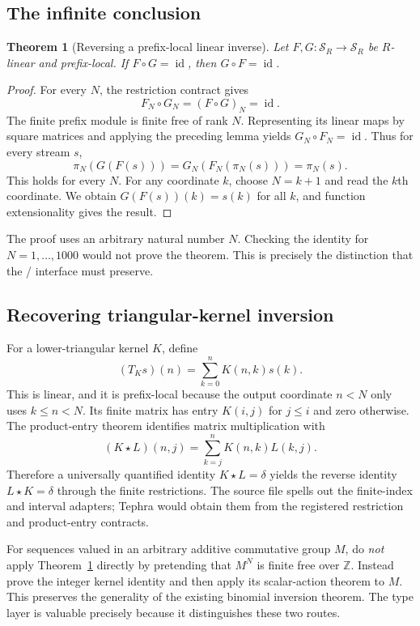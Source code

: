 \documentclass[11pt,a4paper]{article}
\newcommand{\code}[1]{\texttt{\detokenize{#1}}}
\newcommand{\Z}{\mathbb Z}
\newcommand{\id}{\operatorname{id}}
\theoremstyle{plain}
\newtheorem{theorem}{Theorem}[section]
\theoremstyle{definition}
\begin{document}
\subsection{The infinite conclusion}
\begin{theorem}[Reversing a prefix-local linear inverse]\label{thm:prefixinverse}
Let $F,G:\mathcal S_R\to\mathcal S_R$ be $R$-linear and prefix-local. If $F\circ G=\id$, then $G\circ F=\id$.
\end{theorem}
\begin{proof}
For every $N$, the restriction contract gives
\[
 F_N\circ G_N=(F\circ G)_N=\id.
\]
The finite prefix module is finite free of rank $N$. Representing its linear maps by square matrices and applying the preceding lemma yields
$G_N\circ F_N=\id$. Thus for every stream $s$,
\[
 \pi_N(G(F(s)))=G_N(F_N(\pi_N(s)))=\pi_N(s).
\]
This holds for every $N$. For any coordinate $k$, choose $N=k+1$ and read the $k$th coordinate. We obtain $G(F(s))(k)=s(k)$ for all $k$, and function extensionality gives the result.
\end{proof}
The proof uses an arbitrary natural number $N$. Checking the identity for $N=1,\ldots,1000$ would not prove the theorem. This is precisely the distinction that the \code{observe}/\code{all_prefixes} interface must preserve.

\subsection{Recovering triangular-kernel inversion}
For a lower-triangular kernel $K$, define
\[
 (T_Ks)(n)=\sum_{k=0}^n K(n,k)s(k).
\]
This is linear, and it is prefix-local because the output coordinate $n<N$ only uses $k\le n<N$. Its finite matrix has entry $K(i,j)$ for $j\le i$ and zero otherwise. The product-entry theorem identifies matrix multiplication with
\[
 (K\star L)(n,j)=\sum_{k=j}^n K(n,k)L(k,j).
\]
Therefore a universally quantified identity $K\star L=\delta$ yields the reverse identity $L\star K=\delta$ through the finite restrictions. The source file spells out the finite-index and interval adapters; Tephra would obtain them from the registered restriction and product-entry contracts.

For sequences valued in an arbitrary additive commutative group $M$, do \emph{not} apply Theorem~\ref{thm:prefixinverse} directly by pretending that $M^N$ is finite free over $\Z$. Instead prove the integer kernel identity and then apply its scalar-action theorem to $M$. This preserves the generality of the existing binomial inversion theorem. The type layer is valuable precisely because it distinguishes these two routes.
\end{document}
